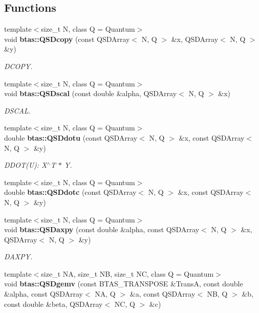 \subsection*{Functions}
\begin{DoxyCompactItemize}
\item 
{\footnotesize template$<$size\-\_\-t N, class Q  = Quantum$>$ }\\void {\bf btas\-::\-Q\-S\-Dcopy} (const Q\-S\-D\-Array$<$ N, Q $>$ \&x, Q\-S\-D\-Array$<$ N, Q $>$ \&y)
\begin{DoxyCompactList}\small\item\em D\-C\-O\-P\-Y. \end{DoxyCompactList}\item 
{\footnotesize template$<$size\-\_\-t N, class Q  = Quantum$>$ }\\void {\bf btas\-::\-Q\-S\-Dscal} (const double \&alpha, Q\-S\-D\-Array$<$ N, Q $>$ \&x)
\begin{DoxyCompactList}\small\item\em D\-S\-C\-A\-L. \end{DoxyCompactList}\item 
{\footnotesize template$<$size\-\_\-t N, class Q  = Quantum$>$ }\\double {\bf btas\-::\-Q\-S\-Ddotu} (const Q\-S\-D\-Array$<$ N, Q $>$ \&x, const Q\-S\-D\-Array$<$ N, Q $>$ \&y)
\begin{DoxyCompactList}\small\item\em D\-D\-O\-T(\-U)\-: X$^\wedge$\-T $\ast$ Y. \end{DoxyCompactList}\item 
{\footnotesize template$<$size\-\_\-t N, class Q  = Quantum$>$ }\\double {\bf btas\-::\-Q\-S\-Ddotc} (const Q\-S\-D\-Array$<$ N, Q $>$ \&x, const Q\-S\-D\-Array$<$ N, Q $>$ \&y)
\item 
{\footnotesize template$<$size\-\_\-t N, class Q  = Quantum$>$ }\\void {\bf btas\-::\-Q\-S\-Daxpy} (const double \&alpha, const Q\-S\-D\-Array$<$ N, Q $>$ \&x, Q\-S\-D\-Array$<$ N, Q $>$ \&y)
\begin{DoxyCompactList}\small\item\em D\-A\-X\-P\-Y. \end{DoxyCompactList}\item 
{\footnotesize template$<$size\-\_\-t N\-A, size\-\_\-t N\-B, size\-\_\-t N\-C, class Q  = Quantum$>$ }\\void {\bf btas\-::\-Q\-S\-Dgemv} (const B\-T\-A\-S\-\_\-\-T\-R\-A\-N\-S\-P\-O\-S\-E \&Trans\-A, const double \&alpha, const Q\-S\-D\-Array$<$ N\-A, Q $>$ \&a, const Q\-S\-D\-Array$<$ N\-B, Q $>$ \&b, const double \&beta, Q\-S\-D\-Array$<$ N\-C, Q $>$ \&c)

\end{DoxyCompactItemize}
